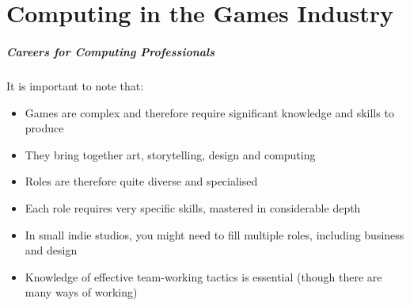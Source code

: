 










\part{Computing in the Games Industry}
\frame{\partpage}

\begin{frame}
	\frametitle{Careers for Computing Professionals}
	
	It is important to note that:\pause
	
	\begin{itemize}
		\item Games are complex and therefore require significant knowledge and skills to produce \pause
		\item They bring together art, storytelling, design and computing \pause
		\item Roles are therefore quite diverse and specialised \pause
		\item Each role requires very specific skills, mastered in considerable depth \pause
		\item In small indie studios, you might need to fill multiple roles, including business and design \pause
		\item Knowledge of effective team-working tactics is essential (though there are many ways of working)
	\end{itemize}
\end{frame}

